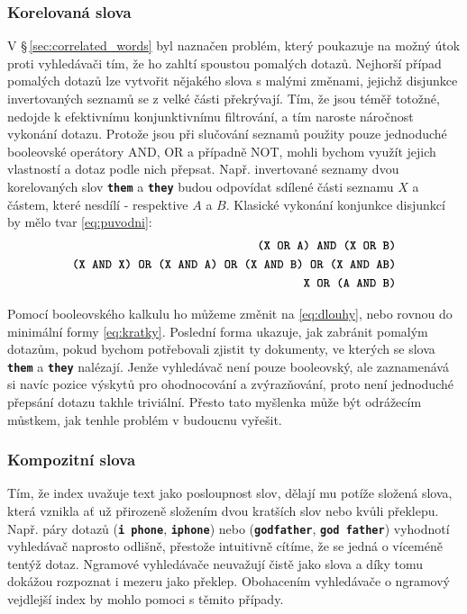 \documentclass[11pt,letterpaper,oneside,openright]{book}
\newcommand{\bftt}[1]{\texttt{\textbf{#1}}}
\begin{document}
\subsubsection{Korelovaná slova} \label{sec:correlated_solution}
V \S\,\ref{sec:correlated_words} byl naznačen problém, který poukazuje na možný
útok proti vyhledávači tím, že ho zahltí spoustou pomalých dotazů. Nejhorší
případ pomalých dotazů lze vytvořit nějakého slova s malými změnami, jejichž
disjunkce invertovaných seznamů se z velké části překrývají. Tím, že jsou téměř
totožné, nedojde k efektivnímu konjunktivnímu filtrování, a tím naroste
náročnost vykonání dotazu. Protože jsou při slučování seznamů použity pouze
jednoduché booleovské operátory AND, OR a případně NOT, mohli bychom využít
jejich vlastností a dotaz podle nich přepsat. Např. invertované seznamy dvou
korelovaných slov \bftt{them} a \bftt{they} budou odpovídat sdílené části
seznamu $X$ a částem, které nesdílí - respektive $A$ a $B$. Klasické vykonání
konjunkce disjunkcí by mělo tvar \ref{eq:puvodni}:
\begin{align}
\bftt{(X OR A) AND (X OR B)} \label{eq:puvodni} \\
\bftt{(X AND X) OR (X AND A) OR (X AND B) OR (X AND AB)} \label{eq:dlouhy} \\
\bftt{X OR (A AND B)} \label{eq:kratky}
\end{align}

Pomocí booleovského kalkulu ho můžeme změnit na \ref{eq:dlouhy}, nebo rovnou do
minimální formy \ref{eq:kratky}. Poslední forma ukazuje, jak zabránit pomalým
dotazům, pokud bychom potřebovali zjistit ty dokumenty, ve kterých se slova
\bftt{them} a \bftt{they} nalézají. Jenže vyhledávač není pouze booleovský, ale
zaznamenává si navíc pozice výskytů pro ohodnocování a zvýrazňování, proto není
jednoduché přepsání dotazu takhle triviální. Přesto tato myšlenka může být
odrážecím můstkem, jak tenhle problém v budoucnu vyřešit.

\subsubsection{Kompozitní slova}
Tím, že index uvažuje text jako posloupnost slov, dělají mu potíže složená
slova, která vznikla ať už přirozeně složením dvou kratších slov nebo kvůli
překlepu. Např. páry dotazů (\bftt{i phone}, \bftt{iphone}) nebo
(\bftt{godfather}, \bftt{god father}) vyhodnotí vyhledávač naprosto odlišně,
přestože intuitivně cítíme, že se jedná o víceméně tentýž dotaz. Ngramové
vyhledávače neuvažují čistě jako slova a díky tomu dokážou rozpoznat i mezeru
jako překlep. Obohacením vyhledávače o ngramový vejdlejší index by mohlo pomoci
s těmito případy.
\end{document}
